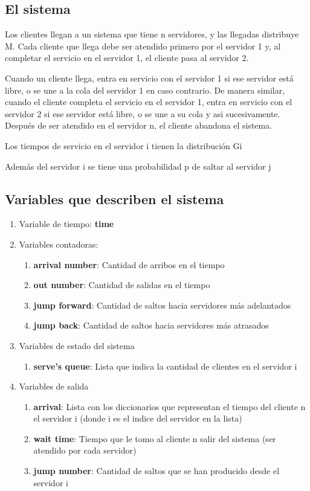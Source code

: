 \documentclass{article}
\begin{document}
\subsection{El sistema}
Los clientes llegan a un sistema que tiene n servidores, y las llegadas distribuye M. Cada cliente que llega debe ser atendido primero por el servidor 1 y, al completar el servicio en el servidor 1, el cliente pasa al servidor 2.

Cuando un cliente llega, entra en servicio con el servidor 1 si ese servidor está libre, o se une a la cola del servidor 1 en caso contrario. De manera similar, cuando el cliente completa el servicio en el servidor 1, entra en servicio con el servidor 2 si ese servidor está libre, o se une a su cola y asi sucesivamente. Después de ser atendido en el servidor n, el cliente abandona el sistema.

Los tiempos de servicio en el servidor i tienen la distribución Gi

Además del servidor i se tiene una probabilidad p de saltar al servidor j

\subsection{Variables que describen el sistema}
\begin{enumerate}
\item{Variable de tiempo: \textbf{time}}
\item{Variables contadoras:}
\begin{enumerate}[label=\alph*]
\item{\textbf{arrival number}: Cantidad de arribos en el tiempo}
\item{\textbf{out number}: Cantidad de salidas en el tiempo }
\item{\textbf{jump forward}: Cantidad de saltos hacia servidores más adelantados }
\item{\textbf{jump back}: Cantidad de saltos hacia servidores más atrasados }
\end{enumerate}
\item{Variables de estado del sistema}
\begin{enumerate}[label=\alph*]
\item{\textbf{serve's queue}: Lista que indica la cantidad de clientes en el servidor i}
\end{enumerate}
\item{Variables de salida}
\begin{enumerate}[label=\alph*]
\item{\textbf{arrival}: Lista con los diccionarios que representan el tiempo del cliente n el servidor i (donde i es el indice del servidor en la lista)}
\item{\textbf{wait time}: Tiempo que le tomo al cliente n salir del sistema (ser atendido por cada servidor)}
\item{\textbf{jump number}: Cantidad de saltos que se han producido desde el servidor i}
\end{enumerate}
\end{enumerate}
\end{document}
